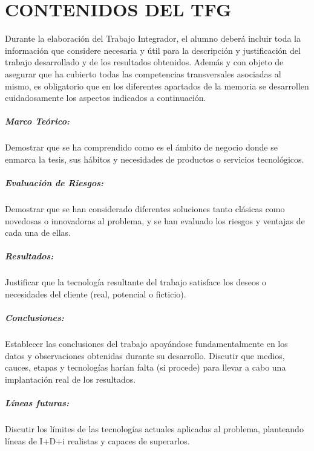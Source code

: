 \chapter{CONTENIDOS DEL TFG}
\thispagestyle{empty}

Durante la elaboración del Trabajo Integrador, el alumno deberá incluir toda la información que considere necesaria y útil para la descripción y justificación del trabajo desarrollado y de los resultados obtenidos. Además y con objeto de asegurar que ha cubierto todas las competencias transversales asociadas al mismo, es obligatorio que en los diferentes apartados de la memoria se desarrollen cuidadosamente los aspectos indicados a continuación.

\paragraph{Marco Teórico:}
Demostrar que se ha comprendido como es el ámbito de negocio donde se enmarca la tesis, sus hábitos y necesidades de productos o servicios tecnológicos.

\paragraph{Evaluación de Riesgos:}
Demostrar que se han considerado diferentes soluciones tanto clásicas como novedosas o innovadoras al problema, y se han evaluado los riesgos y ventajas de cada una de ellas.

\paragraph{Resultados:}
Justificar que la tecnología resultante del trabajo satisface los deseos o necesidades del cliente (real, potencial o ficticio). 

\paragraph{Conclusiones:}
Establecer las conclusiones del trabajo apoyándose fundamentalmente en los datos y observaciones obtenidas durante su desarrollo.
Discutir que medios, cauces, etapas y tecnologías harían falta (si procede) para llevar a cabo una implantación real de los resultados. 

\paragraph{Líneas futuras:}
Discutir los límites de las tecnologías actuales aplicadas al problema, planteando líneas de I+D+i realistas y capaces de superarlos.